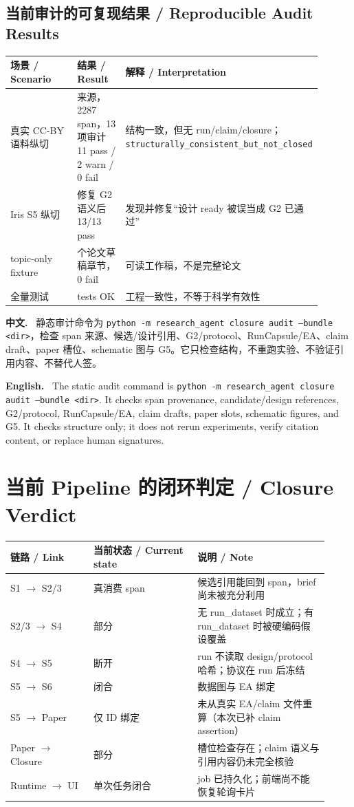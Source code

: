 \documentclass[UTF8,11pt]{ctexart}
\newcommand{\zh}{\par\noindent\textbf{中文.}\ }
\newcommand{\en}{\par\noindent\textbf{English.}\ }
\begin{document}
\subsection{当前审计的可复现结果 / Reproducible Audit Results}
\begin{longtable}{>{\raggedright\arraybackslash}p{0.27\linewidth} >{\raggedright\arraybackslash}p{0.18\linewidth} >{\raggedright\arraybackslash}p{0.45\linewidth}}
\toprule
场景 / Scenario & 结果 / Result & 解释 / Interpretation\\
\midrule
\endhead
真实 CC-BY 语料纵切 & 4 来源，2287 span，13 项审计 11 pass / 2 warn / 0 fail & 结构一致，但无 run/claim/closure；\texttt{structurally\_consistent\_but\_not\_closed}\\
Iris S5 纵切 & 修复 G2 语义后 13/13 pass & 发现并修复“设计 ready 被误当成 G2 已通过”\\
topic-only fixture & 8 个论文草稿章节，0 fail & 可读工作稿，不是完整论文\\
全量测试 & 150 tests OK & 工程一致性，不等于科学有效性\\
\bottomrule
\end{longtable}

\zh
静态审计命令为 \texttt{python -m research\_agent closure audit --bundle <dir>}，检查 span 来源、候选/设计引用、G2/protocol、RunCapsule/EA、claim draft、paper 槽位、schematic 图与 G5。它只检查结构，不重跑实验、不验证引用内容、不替代人签。
\en
The static audit command is \texttt{python -m research\_agent closure audit --bundle <dir>}. It checks span provenance, candidate/design references, G2/protocol, RunCapsule/EA, claim drafts, paper slots, schematic figures, and G5. It checks structure only; it does not rerun experiments, verify citation content, or replace human signatures.

\section{当前 Pipeline 的闭环判定 / Closure Verdict}

\begin{longtable}{>{\raggedright\arraybackslash}p{0.24\linewidth} >{\raggedright\arraybackslash}p{0.30\linewidth} >{\raggedright\arraybackslash}p{0.38\linewidth}}
\toprule
链路 / Link & 当前状态 / Current state & 说明 / Note\\
\midrule
\endhead
S1 $\rightarrow$ S2/3 & 真消费 span & 候选引用能回到 span，brief 尚未被充分利用\\
S2/3 $\rightarrow$ S4 & 部分 & 无 run\_dataset 时成立；有 run\_dataset 时被硬编码假设覆盖\\
S4 $\rightarrow$ S5 & 断开 & run 不读取 design/protocol 哈希；协议在 run 后冻结\\
S5 $\rightarrow$ S6 & 闭合 & 数据图与 EA 绑定\\
S5 $\rightarrow$ Paper & 仅 ID 绑定 & 未从真实 EA/claim 文件重算（本次已补 claim assertion）\\
Paper $\rightarrow$ Closure & 部分 & 槽位检查存在；claim 语义与引用内容仍未完全核验\\
Runtime $\rightarrow$ UI & 单次任务闭合 & job 已持久化；前端尚不能恢复轮询卡片\\
\bottomrule
\end{longtable}
\end{document}
